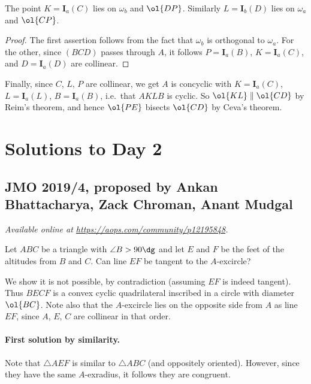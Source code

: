 \documentclass[11pt]{scrartcl}
\begin{document}
\begin{claim*}
  The point $K = \mathbf{I}_a(C)$ lies on $\omega_b$ and $\ol{DP}$.
  Similarly $L = \mathbf{I}_b(D)$ lies on  $\omega_a$ and $\ol{CP}$.
\end{claim*}
\begin{proof}
  The first assertion follows from the fact that $\omega_b$ is orthogonal to $\omega_a$.
  For the other, since $(BCD)$ passes through $A$, it follows $P = \mathbf{I}_a(B)$, $K = \mathbf{I}_a(C)$,
  and $D = \mathbf{I}_a(D)$ are collinear.
\end{proof}

Finally, since $C$, $L$, $P$ are collinear,
we get $A$ is concyclic with $K = \mathbf{I}_a(C)$,
$L = \mathbf{I}_a(L)$, $B = \mathbf{I}_a(B)$, i.e.\ that $AKLB$ is cyclic.
So $\ol{KL} \parallel \ol{CD}$ by Reim's theorem,
and hence $\ol{PE}$ bisects $\ol{CD}$ by Ceva's theorem.
\pagebreak

\section{Solutions to Day 2}
\subsection{JMO 2019/4, proposed by Ankan Bhattacharya, Zack Chroman, Anant Mudgal}
\textsl{Available online at \url{https://aops.com/community/p12195848}.}
\begin{mdframed}[style=mdpurplebox,frametitle={Problem statement}]
Let $ABC$ be a triangle with $\angle B > 90\dg$
and let $E$ and $F$ be the feet of the altitudes from $B$ and $C$.
Can line $EF$ be tangent to the $A$-excircle?
\end{mdframed}
We show it is not possible, by contradiction
(assuming $EF$ is indeed tangent).
Thus $BECF$ is a convex cyclic quadrilateral
inscribed in a circle with diameter $\ol{BC}$.
Note also that the $A$-excircle lies on the opposite side
from $A$ as line $EF$, since $A$, $E$, $C$ are collinear
in that order.

\paragraph{First solution by similarity.}
Note that $\triangle AEF$ is similar to $\triangle ABC$
(and oppositely oriented).
However, since they have the same $A$-exradius,
it follows they are congruent.
\end{document}
